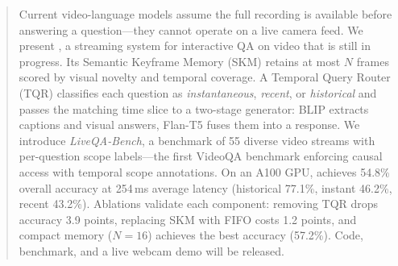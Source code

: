 \begin{abstract}
Current video-language models assume the full recording is available before answering a question---they cannot operate on a live camera feed.
We present \ours, a streaming system for interactive QA on video that is still in progress.
Its Semantic Keyframe Memory (SKM) retains at most $N$ frames scored by visual novelty and temporal coverage.
A Temporal Query Router (TQR) classifies each question as \emph{instantaneous}, \emph{recent}, or \emph{historical} and passes the matching time slice to a two-stage generator: BLIP extracts captions and visual answers, Flan-T5 fuses them into a response.
We introduce \emph{LiveQA-Bench}, a benchmark of 55 diverse video streams with per-question scope labels---the first VideoQA benchmark enforcing causal access with temporal scope annotations.
On an A100 GPU, \ours achieves 54.8\% overall accuracy at 254\,ms average latency (historical 77.1\%, instant 46.2\%, recent 43.2\%).
Ablations validate each component: removing TQR drops accuracy 3.9 points, replacing SKM with FIFO costs 1.2 points, and compact memory ($N\!=\!16$) achieves the best accuracy (57.2\%).
Code, benchmark, and a live webcam demo will be released.
\end{abstract}
